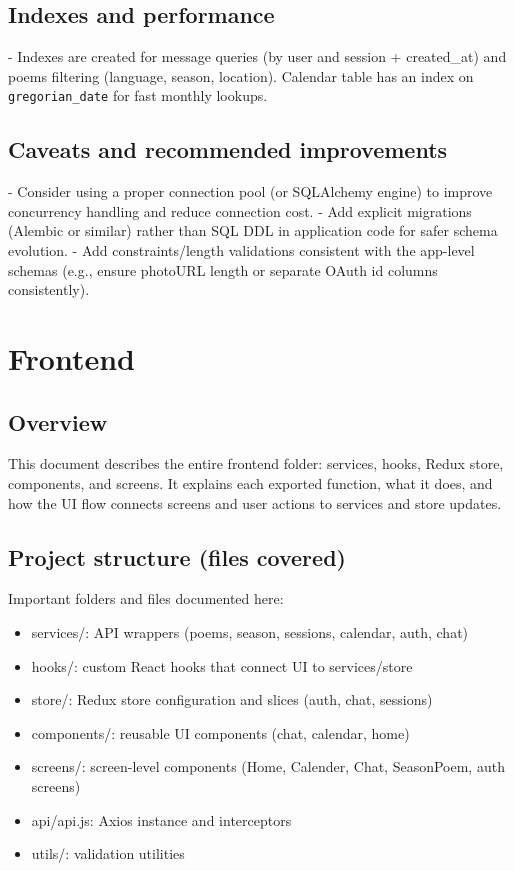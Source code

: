 \documentclass[11pt]{article}
\begin{document}
\subsection*{Indexes and performance}
- Indexes are created for message queries (by user and session + created\_at) and poems filtering (language, season, location). Calendar table has an index on \texttt{gregorian\_date} for fast monthly lookups.

\subsection*{Caveats and recommended improvements}
- Consider using a proper connection pool (or SQLAlchemy engine) to improve concurrency handling and reduce connection cost.
- Add explicit migrations (Alembic or similar) rather than SQL DDL in application code for safer schema evolution.
- Add constraints/length validations consistent with the app-level schemas (e.g., ensure photoURL length or separate OAuth id columns consistently).

\newpage

\section{Frontend}


\subsection{Overview}
This document describes the entire frontend folder: services, hooks, Redux store, components, and screens. It explains each exported function, what it does, and how the UI flow connects screens and user actions to services and store updates.

\subsection{Project structure (files covered)}
Important folders and files documented here:
\begin{itemize}
	\item services/: API wrappers (poems, season, sessions, calendar, auth, chat)
	\item hooks/: custom React hooks that connect UI to services/store
	\item store/: Redux store configuration and slices (auth, chat, sessions)
	\item components/: reusable UI components (chat, calendar, home)
	\item screens/: screen-level components (Home, Calender, Chat, SeasonPoem, auth screens)
	\item api/api.js: Axios instance and interceptors
	\item utils/: validation utilities
\end{itemize}
\end{document}
